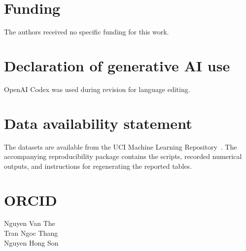 \documentclass[]{interact}
\theoremstyle{plain}
\theoremstyle{definition}
\theoremstyle{remark}
\begin{document}
\section*{Funding}
The authors received no specific funding for this work.
\section*{Declaration of generative AI use}
OpenAI Codex was used during revision for language editing.
\section*{Data availability statement}
The datasets are available from the UCI Machine Learning Repository~\citep{kelly2023uci}. The accompanying reproducibility package contains the scripts, recorded numerical outputs, and instructions for regenerating the reported tables.

\section*{ORCID}
\noindent Nguyen Van The~\\ Tran Ngoc Thang~\\ Nguyen Hong Son~
\end{document}
